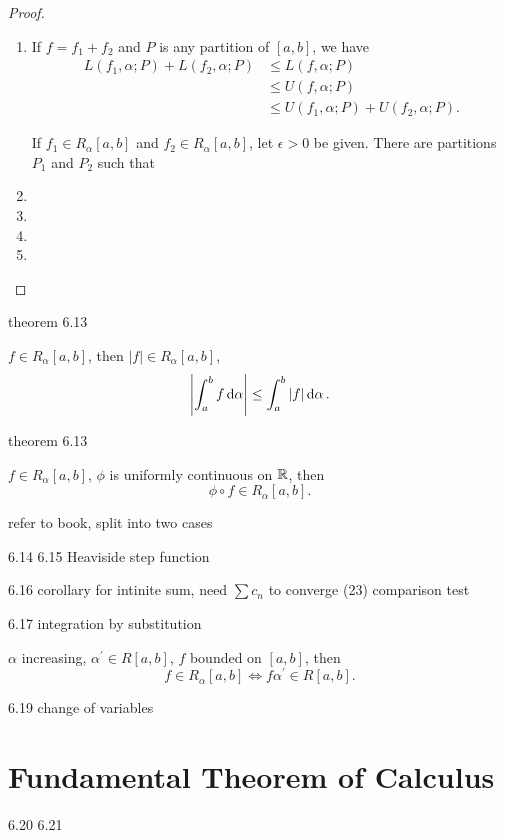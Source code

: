 \begin{proof} \
\begin{enumerate}[label=(\arabic*)]
\item If $f=f_1+f_2$ and $P$ is any partition of $[a,b]$, we have
\begin{align*}
L(f_1,\alpha;P)+L(f_2,\alpha;P)&\le L(f,\alpha;P)\\
&\le U(f,\alpha;P)\\
&\le U(f_1,\alpha;P)+U(f_2,\alpha;P).
\end{align*}

If $f_1\in R_\alpha[a,b]$ and $f_2\in R_\alpha[a,b]$, let $\epsilon>0$ be given. There are partitions $P_1$ and $P_2$ such that


\item 
\item 
\item 
\item 
\end{enumerate}
\end{proof}

theorem 6.13
\begin{theorem}
$f\in R_\alpha[a,b]$, then $|f|\in R_\alpha[a,b]$,
\[ \left|\int_a^bf\dd{\alpha}\right|\le\int_a^b|f|\dd{\alpha}. \]
\end{theorem}

theorem 6.13
\begin{theorem}
$f\in R_\alpha[a,b]$, $\phi$ is uniformly continuous on $\mathbb R$, then
\[ \phi\circ f\in R_\alpha[a,b]. \]
\end{theorem}
refer to book, split into two cases

6.14 6.15
Heaviside step function

6.16 corollary
for intinite sum, need $\sum c_n$ to converge
(23) comparison test

6.17 integration by substitution
\begin{theorem}
$\alpha$ increasing, $\alpha^\prime\in R[a,b]$, $f$ bounded on $[a,b]$, then
\[ f\in R_\alpha[a,b]\iff f\alpha^\prime\in R[a,b]. \]
\end{theorem}

6.19 change of variables

\section{Fundamental Theorem of Calculus}
6.20 6.21

\begin{theorem}

\end{theorem}

